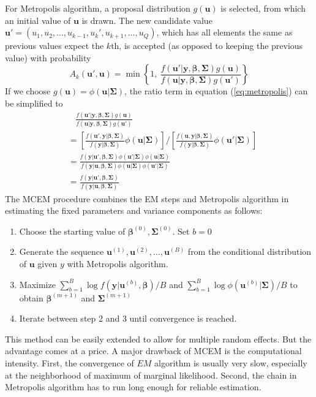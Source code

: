 For Metropolis algorithm, a proposal distribution $g(\bm u)$ is selected, from which an initial
value of $\bm u$ is drawn. The new candidate value $\bm u' = (u_1, u_2, \ldots,u_{k-1}, u_k',
u_{k+1}, \ldots, u_Q)$, which has all elements the same as previous values expect the $k$th,   is
accepted (as opposed to keeping the previous value) with probability
\begin{equation}\label{eq:metropolis}
	A_k(\bm u', \bm u) = \min \left\{1, ~\frac{f(\bm u'|\bm y, \bm \beta, \bm \Sigma)g(\bm u)}{f(\bm
		u|\bm y, \bm \beta, \bm \Sigma)g(\bm u')}\right\}
\end{equation}
If we choose $g(\bm u) = \phi (\bm u|\bm\Sigma)$, the ratio term in equation (\ref{eq:metropolis})
can be simplified to 
\begin{equation}\label{eq2.3.4}
	\begin{aligned}
		& ~~~~\frac{f(\bm u'|\bm y, \bm \beta, \bm \Sigma)g(\bm u)}{f(\bm u|\bm y, \bm \beta, \bm
			\Sigma)g(\bm u')} \\
		& = \left[\frac{f(\bm u', \bm y| \bm \beta, \bm \Sigma)}{f(\bm y| \bm \beta, \bm \Sigma)}\phi (\bm
		u|\bm\Sigma)\right]/\left[
		\frac{f(\bm u, \bm y|\bm \beta, \bm \Sigma)}{f(\bm y|\bm \beta, \bm \Sigma)}\phi (\bm
		u'|\bm\Sigma)\right]\\
		& = \frac{f(\bm y|\bm u', \bm \beta, \bm \Sigma)\phi (\bm u'|\bm\Sigma)\phi (\bm
			u|\bm\Sigma)}{f(\bm y|\bm u, \bm \beta, \bm \Sigma)\phi (\bm u|\bm\Sigma)\phi (\bm u'|\bm\Sigma)}\\
		& = \frac{f(\bm y|\bm u', \bm \beta, \bm \Sigma)}{f(\bm y|\bm u, \bm \beta, \bm \Sigma)}
	\end{aligned}
\end{equation}
The MCEM procedure combines the EM steps and Metropolis algorithm in estimating the fixed
parameters and variance components as follows:
\begin{enumerate}
	\item Choose the starting value of $\bm \beta^{(0)}, \bm \Sigma^{(0)}$. Set $b= 0$
	\item Generate the sequence $\bm u^{(1)}, \bm u^{(2)}, \ldots, \bm u^{(B)}$ from the conditional
	distribution of $\bm u$ given $y$ with Metropolis algorithm.
	\item Maximize $\sum_{b=1}^B \log f(\bm y|\bm u^{(b)}, \bm\beta)/B$ and $\sum_{b=1}^B\log\phi(\bm
	u^{(b)}|\bm \Sigma)/B$ to obtain $\bm \beta^{(m+1)}$ and $\bm\Sigma^{(m+1)}$
	\item Iterate between step 2 and 3 until convergence is reached.
\end{enumerate}
This method can be easily extended to allow for multiple random effects. But the advantage comes
at a price. A major drawback of MCEM is the computational intensity.  First, the convergence of $EM$
algorithm is usually very slow, especially at the neighborhood of maximum of marginal likelihood.
Second, the chain in Metropolis algorithm has to run long enough for reliable estimation. 

